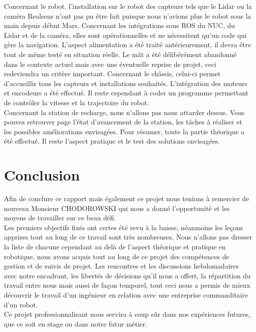 \documentclass[french]{rapportENSTAB}
\begin{document}
Concernant le robot, l'installation sur le robot des capteurs tels que le Lidar ou la caméra Realsens n'ont pas pu être fait puisque nous n'avions plus le robot sous la main depuis début Mars. Concernant les intégrations sous ROS du NUC, du Lidar et de la caméra, elles sont opérationnelles et ne nécessitent qu'un code qui gère la navigation. L'aspect alimentation a été traité antérieurement, il devra être tout de même testé en situation réelle. Le mât a été délibérément abandonné dans le contexte actuel mais avec une éventuelle reprise de projet, ceci redeviendra un critère important. Concernant le châssis, celui-ci permet d'accueillir tous les capteurs et installations souhaités. L'intégration des moteurs et encodeurs a été effectué. Il reste cependant à coder un programme permettant de contrôler la vitesse et la trajectoire du robot.\\

Concernant la station de recharge, nous n'allons pas nous attarder dessus. Vous pouvez retrouver page \pageref{station} l'état d'avancement de la station, les tâches à réaliser et les possibles améliorations envisagées. Pour résumer, toute la partie théorique a été effectué. Il reste l'aspect pratique et le test des solutions envisagées.



\section{Conclusion}

Afin de conclure ce rapport mais également ce projet nous tenions à remercier de nouveau Monsieur CHODOROWSKI qui nous a donné l'opportunité et les moyens de travailler sur ce beau défi. \\

Les premiers objectifs fixés ont certes été revu à la baisse, néanmoins les leçons apprises tout au long de ce travail sont très nombreuses. Nous n'allons pas dresser la liste de chacune cependant au delà de l'aspect théorique et pratique en robotique, nous avons acquis tout au long de ce projet des compétences de gestion et de suivis de projet. Les rencontres et les discussions hebdomadaires avec notre encadrant, les libertés de décisions qu'il nous a offert, la répartition du travail entre nous mais aussi de façon temporel, tout ceci nous a permis de mieux découvrir le travail d'un ingénieur en relation avec une entreprise commanditaire d'un robot. \\

Ce projet professionnalisant nous servira à coup sûr dans nos expériences futures, que ce soit en stage ou dans notre futur métier. \\
\end{document}
